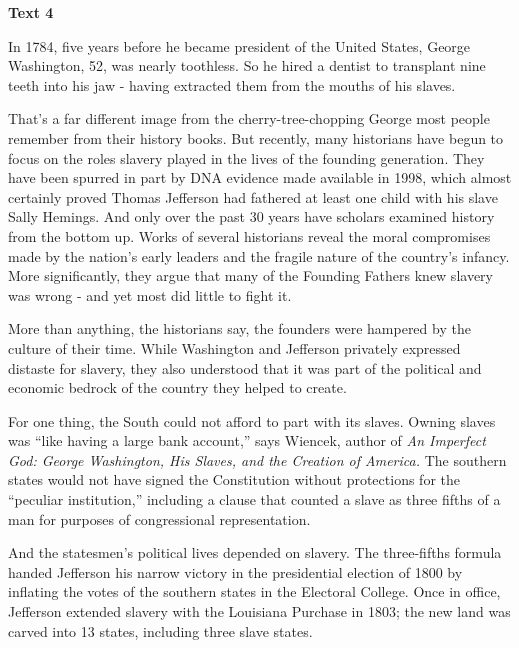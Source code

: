 
\begin{center}\textbf{Text 4}\end{center}

\qquad In 1784, five years before he became president of the United States, George Washington, 52, was nearly toothless. So he hired a dentist to transplant nine teeth into his jaw - having extracted them from the mouths of his slaves.

\qquad That's a far different image from the cherry-tree-chopping George most people remember from their history books. But recently, many historians have begun to focus on the roles slavery played in the lives of the founding generation. They have been spurred in part by DNA evidence made available in 1998, which almost certainly proved Thomas Jefferson had fathered at least one child with his slave Sally Hemings. And only over the past 30 years have scholars examined history from the bottom up. Works of several historians reveal the moral compromises made by the nation's early leaders and the fragile nature of the country's infancy. More significantly, they argue that many of the Founding Fathers knew slavery was wrong - and yet most did little to fight it.

\qquad More than anything, the historians say, the founders were hampered by the culture of their time. While Washington and Jefferson privately expressed distaste for slavery, they also understood that it was part of the political and economic bedrock of the country they helped to create.

\qquad For one thing, the South could not afford to part with its slaves. Owning slaves was ``like having a large bank account,'' says Wiencek, author of \emph{An Imperfect God: George Washington, His Slaves, and the Creation of America.} The southern states would not have signed the Constitution without protections for the ``peculiar institution,'' including a clause that counted a slave as three fifths of a man for purposes of congressional representation.

\qquad And the statesmen's political lives depended on slavery. The three-fifths formula handed Jefferson his narrow victory in the presidential election of 1800 by inflating the votes of the southern states in the Electoral College. Once in office, Jefferson extended slavery with the Louisiana Purchase in 1803; the new land was carved into 13 states, including three slave states.

